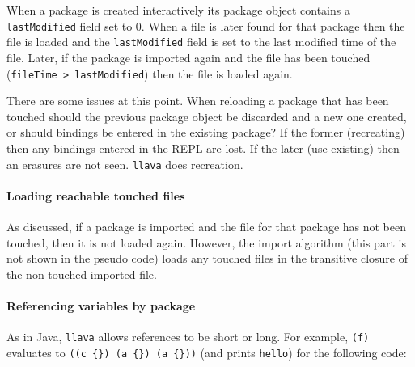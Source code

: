 \documentclass{acm-final/sig-alternate-modified}
\begin{document}
When a package is created interactively its package object contains a
{\tt lastModified} field set to 0.  When a file is later found for
that package then the file is loaded and the {\tt lastModified} field
is set to the last modified time of the file.  Later, if the package
is imported again and the file has been touched ({\tt fileTime >
lastModified}) then the file is loaded again.

There are some issues at this point.  When reloading a package that
has been touched should the previous package object be discarded and a
new one created, or should bindings be entered in the existing
package?  If the former (recreating) then any bindings entered in the
REPL are lost.  If the later (use existing) then an erasures are not
seen.  {\tt llava} does recreation.

\paragraph{Loading reachable touched files}

As discussed, if a package is imported and the file for that package
has not been touched, then it is not loaded again.  However, the
import algorithm (this part is not shown in the pseudo code) loads any
touched files in the transitive closure of the non-touched imported
file.

\paragraph{Referencing variables by package}

As in Java, {\tt llava} allows references to be short or long.  For
example, {\tt (f)} evaluates to \verb+((c {}) (a {}) (a {}))+ (and
prints {\tt hello}) for the following code:
\end{document}
